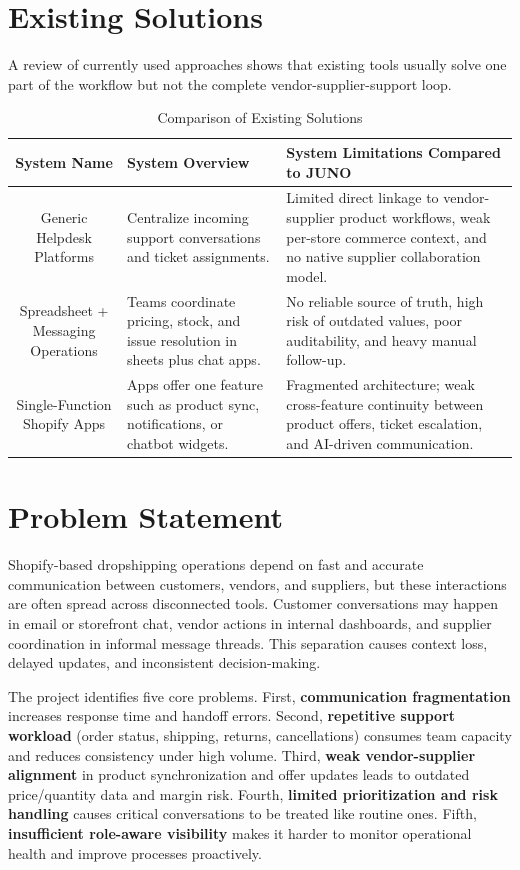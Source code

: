 \section{Existing Solutions}

A review of currently used approaches shows that existing tools usually solve one part of the workflow but not the complete vendor-supplier-support loop.

\begin{table}[H]
\centering
\caption{Comparison of Existing Solutions}
\begin{tabular}{|c|p{5cm}|p{5cm}|}
\hline
\textbf{System Name} & \textbf{System Overview} & \textbf{System Limitations Compared to JUNO} \\ \hline
Generic Helpdesk Platforms & Centralize incoming support conversations and ticket assignments. & Limited direct linkage to vendor-supplier product workflows, weak per-store commerce context, and no native supplier collaboration model. \\ \hline
Spreadsheet + Messaging Operations & Teams coordinate pricing, stock, and issue resolution in sheets plus chat apps. & No reliable source of truth, high risk of outdated values, poor auditability, and heavy manual follow-up. \\ \hline
Single-Function Shopify Apps & Apps offer one feature such as product sync, notifications, or chatbot widgets. & Fragmented architecture; weak cross-feature continuity between product offers, ticket escalation, and AI-driven communication. \\ \hline
\end{tabular}
\label{tab:system_comparison}
\end{table}

\section{Problem Statement}

Shopify-based dropshipping operations depend on fast and accurate communication between customers, vendors, and suppliers, but these interactions are often spread across disconnected tools. Customer conversations may happen in email or storefront chat, vendor actions in internal dashboards, and supplier coordination in informal message threads. This separation causes context loss, delayed updates, and inconsistent decision-making.

The project identifies five core problems. First, \textbf{communication fragmentation} increases response time and handoff errors. Second, \textbf{repetitive support workload} (order status, shipping, returns, cancellations) consumes team capacity and reduces consistency under high volume. Third, \textbf{weak vendor-supplier alignment} in product synchronization and offer updates leads to outdated price/quantity data and margin risk. Fourth, \textbf{limited prioritization and risk handling} causes critical conversations to be treated like routine ones. Fifth, \textbf{insufficient role-aware visibility} makes it harder to monitor operational health and improve processes proactively.

